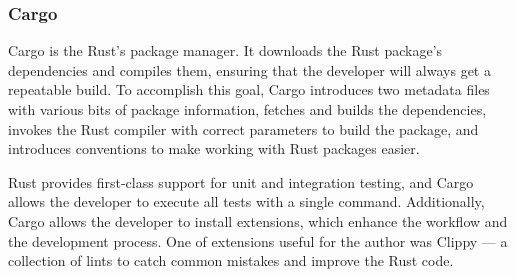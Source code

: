 \documentclass[english,engineering]{wizthesis}
\newcommand{\paraphrase}[1]{#1}
\begin{document}
\subsubsection*{Cargo}

Cargo is the Rust's package manager. \paraphrase{It downloads the Rust package's
dependencies and compiles them, ensuring that the developer will always get a
repeatable build. To accomplish this goal, Cargo introduces two metadata files
with various bits of package information, fetches and builds the dependencies,
invokes the Rust compiler with correct parameters to build the package, and
introduces conventions to make working with Rust packages easier.}

Rust provides first-class support for unit and integration testing, and Cargo
allows the developer to execute all tests with a single command. Additionally,
Cargo allows the developer to install extensions, which enhance the workflow and
the development process. One of extensions useful for the author was Clippy ---
a collection of lints to catch common mistakes and improve the Rust code.
\end{document}
